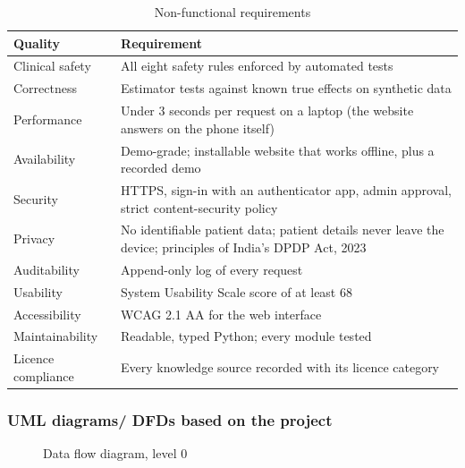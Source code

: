 \begin{table}[H]\centering\small\caption{Non-functional requirements}\label{tab:nfr}
\begin{tabularx}{\textwidth}{p{3.2cm}Y}\toprule
Quality & Requirement\\\midrule
Clinical safety & All eight safety rules enforced by automated tests\\
Correctness & Estimator tests against known true effects on synthetic data\\
Performance & Under 3 seconds per request on a laptop (the website answers on the phone itself)\\
Availability & Demo-grade; installable website that works offline, plus a recorded demo\\
Security & HTTPS, sign-in with an authenticator app, admin approval, strict content-security policy\\
Privacy & No identifiable patient data; patient details never leave the device; principles of India's DPDP Act, 2023\\
Auditability & Append-only log of every request\\
Usability & System Usability Scale score of at least 68 \cite{brooke1996}\\
Accessibility & WCAG 2.1 AA for the web interface\\
Maintainability & Readable, typed Python; every module tested\\
Licence compliance & Every knowledge source recorded with its licence category\\\bottomrule
\end{tabularx}\end{table}

\subsubsection{UML diagrams/ DFDs based on the project}
\begin{figure}[H]\centering
{}\caption{Data flow diagram, level 0}\label{fig:dfd0}\end{figure}

